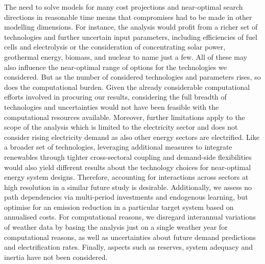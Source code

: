The need to solve models for many cost projections and near-optimal search
directions in reasonable time means that compromises had to be made in other
modelling dimensions. For instance, the analysis would profit from a richer set
of technologies and further uncertain input parameters, including efficiencies
of fuel cells and electrolysis or the consideration of concentrating solar
power, geothermal energy, biomass, and nuclear to name just a few. All of these
may also influence the near-optimal range of options for the technologies we
considered. But as the number of considered technologies and parameters rises,
so does the computational burden. Given the already considerable computational
efforts involved in procuring our results, considering the full breadth of
technologies and uncertainties would not have been feasible with the
computational resources available. Moreover, further limitations apply to the
scope of the analysis which is limited to the electricity sector and does not
consider rising electricity demand as also other energy sectors are electrified.
Like a broader set of technologies, leveraging additional measures to integrate
renewables through tighter cross-sectoral coupling and demand-side flexibilities
would also yield different results about the technology choices for near-optimal
energy system designs. Therefore, accounting for interactions across sectors at
high resolution in a similar future study is desirable. Additionally, we assess
no path dependencies via multi-period investments and endogenous learning, but
optimise for an emission reduction in a particular target system based on
annualised costs. For computational reasons, we disregard interannual variations
of weather data by basing the analysis just on a single weather year for
computational reasons, as well as uncertainties about future demand predictions
and electrification rates. Finally, aspects such as reserves, system adequacy
and inertia have not been considered.
